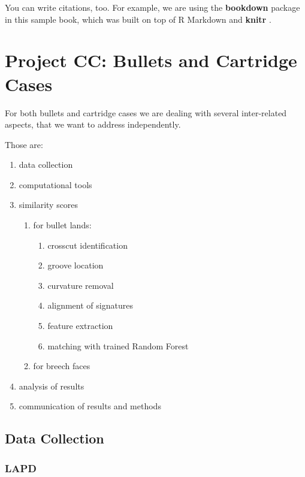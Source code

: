 \documentclass[]{book}
\providecommand{\tightlist}{%
  \setlength{\itemsep}{0pt}\setlength{\parskip}{0pt}}
\begin{document}
You can write citations, too. For example, we are using the \textbf{bookdown} package \citep{R-bookdown} in this sample book, which was built on top of R Markdown and \textbf{knitr} \citep{xie2015}.

\hypertarget{bullets}{%
\chapter{Project CC: Bullets and Cartridge Cases}\label{bullets}}

For both bullets and cartridge cases we are dealing with several inter-related aspects, that we want to address independently.

Those are:

\begin{enumerate}
\def\labelenumi{\arabic{enumi}.}
\item
  data collection
\item
  computational tools
\item
  similarity scores

  \begin{enumerate}
  \def\labelenumii{\arabic{enumii}.}
  \item
    for bullet lands:

    \begin{enumerate}
    \def\labelenumiii{\alph{enumiii}.}
    \tightlist
    \item
      crosscut identification
    \item
      groove location
    \item
      curvature removal
    \item
      alignment of signatures
    \item
      feature extraction
    \item
      matching with trained Random Forest
    \end{enumerate}
  \item
    for breech faces
  \end{enumerate}
\item
  analysis of results
\item
  communication of results and methods
\end{enumerate}

\hypertarget{data-collection}{%
\section{Data Collection}\label{data-collection}}

\hypertarget{lapd}{%
\subsection{LAPD}\label{lapd}}
\end{document}
